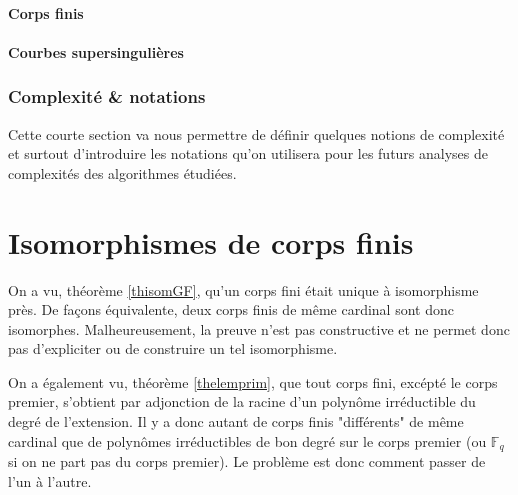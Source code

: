 \documentclass[a4paper]{article} %
\numberwithin{section}{part}
\numberwithin{equation}{section}
\newcommand\GF[1]{\mathbb{F}_{#1}}
\begin{document}
\subsection{Corps finis}


\subsection{Courbes supersingulières}

\section{Complexité \& notations}
Cette courte section va nous permettre de définir quelques notions de complexité
et surtout d'introduire les notations qu'on utilisera pour les futurs analyses
de complexités des algorithmes étudiées.

\part{Isomorphismes de corps finis}
\label{deux}
On a vu, théorème \ref{thisomGF}, qu'un corps fini était unique à isomorphisme
près. De façons équivalente, deux corps finis de même cardinal sont donc 
isomorphes. Malheureusement, la preuve n'est pas constructive et ne permet donc 
pas d'expliciter ou de construire un tel isomorphisme.\par
On a également vu, théorème \ref{thelemprim}, que tout corps fini, excépté le 
corps premier, s'obtient par adjonction de la racine d'un polynôme irréductible
du degré de l'extension. Il y a donc autant de corps finis "différents" de même
cardinal que de polynômes irréductibles de bon degré sur le corps premier (ou 
$\GF{q}$ si on ne part pas du corps premier). Le problème est donc comment 
passer de l'un à l'autre.\par
\end{document}
